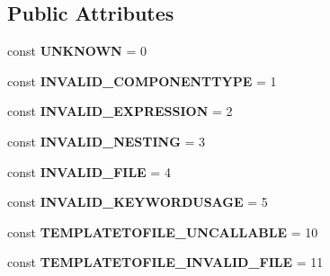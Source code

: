 \subsection*{Public Attributes}
\begin{DoxyCompactItemize}
\item 
\hypertarget{class_i_p_c_o___exception_ac1d6b0d9e77e1eb29b73e764ff4c61d9}{const {\bfseries U\-N\-K\-N\-O\-W\-N} = 0}\label{class_i_p_c_o___exception_ac1d6b0d9e77e1eb29b73e764ff4c61d9}

\item 
\hypertarget{class_i_p_c_o___exception_ad2f02254fec4736deffd001a1bfbcf28}{const {\bfseries I\-N\-V\-A\-L\-I\-D\-\_\-\-C\-O\-M\-P\-O\-N\-E\-N\-T\-T\-Y\-P\-E} = 1}\label{class_i_p_c_o___exception_ad2f02254fec4736deffd001a1bfbcf28}

\item 
\hypertarget{class_i_p_c_o___exception_ada82750a9fb6de9298f65794b3606080}{const {\bfseries I\-N\-V\-A\-L\-I\-D\-\_\-\-E\-X\-P\-R\-E\-S\-S\-I\-O\-N} = 2}\label{class_i_p_c_o___exception_ada82750a9fb6de9298f65794b3606080}

\item 
\hypertarget{class_i_p_c_o___exception_a45847ab05d80ea5c454d04a7cbfcada3}{const {\bfseries I\-N\-V\-A\-L\-I\-D\-\_\-\-N\-E\-S\-T\-I\-N\-G} = 3}\label{class_i_p_c_o___exception_a45847ab05d80ea5c454d04a7cbfcada3}

\item 
\hypertarget{class_i_p_c_o___exception_adc6b70ca8e76519036eb5263d285b54e}{const {\bfseries I\-N\-V\-A\-L\-I\-D\-\_\-\-F\-I\-L\-E} = 4}\label{class_i_p_c_o___exception_adc6b70ca8e76519036eb5263d285b54e}

\item 
\hypertarget{class_i_p_c_o___exception_ae73e8d8699c6fb87b6c4e24afb680980}{const {\bfseries I\-N\-V\-A\-L\-I\-D\-\_\-\-K\-E\-Y\-W\-O\-R\-D\-U\-S\-A\-G\-E} = 5}\label{class_i_p_c_o___exception_ae73e8d8699c6fb87b6c4e24afb680980}

\item 
\hypertarget{class_i_p_c_o___exception_a698fbb63e7b58d00422cc3f9e8a826b9}{const {\bfseries T\-E\-M\-P\-L\-A\-T\-E\-T\-O\-F\-I\-L\-E\-\_\-\-U\-N\-C\-A\-L\-L\-A\-B\-L\-E} = 10}\label{class_i_p_c_o___exception_a698fbb63e7b58d00422cc3f9e8a826b9}

\item 
\hypertarget{class_i_p_c_o___exception_a5a9aef684e8d0edc987009f75e81af66}{const {\bfseries T\-E\-M\-P\-L\-A\-T\-E\-T\-O\-F\-I\-L\-E\-\_\-\-I\-N\-V\-A\-L\-I\-D\-\_\-\-F\-I\-L\-E} = 11}\label{class_i_p_c_o___exception_a5a9aef684e8d0edc987009f75e81af66}


\end{DoxyCompactItemize}
